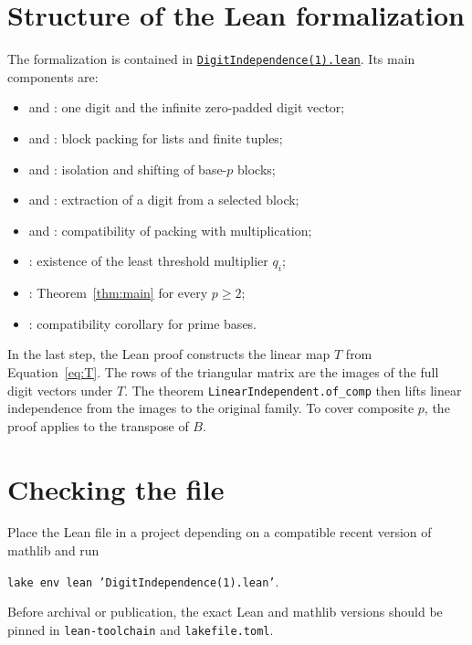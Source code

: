 \documentclass[11pt]{article}
\begin{document}
\section{Structure of the Lean formalization}

The formalization is contained in
\href{run:upload/DigitIndependence(1).lean}{\texttt{DigitIndependence(1).lean}}.
Its main components are:

\begin{itemize}[leftmargin=*,itemsep=3pt]
  \item {} and : one digit and the infinite
        zero-padded digit vector;
  \item {} and : block packing for lists and finite
        tuples;
  \item {} and : isolation and
        shifting of base-$p$ blocks;
  \item {} and : extraction of a digit
        from a selected block;
  \item {} and : compatibility of packing with
        multiplication;
  \item {}: existence of the least threshold multiplier
        $q_i$;
  \item {}: Theorem~\ref{thm:main} for
        every $p\ge2$;
  \item {\small{}}: compatibility
        corollary for prime bases.
\end{itemize}

In the last step, the Lean proof constructs the linear map $T$ from
Equation~\eqref{eq:T}. The rows of the triangular matrix are the images of the
full digit vectors under $T$. The theorem
\texttt{LinearIndependent.of\_comp} then lifts linear independence from the
images to the original family. To cover composite $p$, the proof applies
 to the transpose of $B$.

\section{Checking the file}

Place the Lean file in a project depending on a compatible recent version of
mathlib and run
\begin{center}
  \texttt{lake env lean 'DigitIndependence(1).lean'}.
\end{center}
Before archival or publication, the exact Lean and mathlib versions should be
pinned in \texttt{lean-toolchain} and \texttt{lakefile.toml}.
\end{document}
